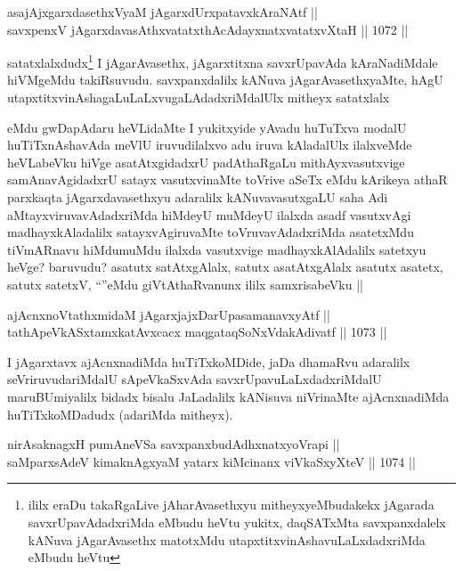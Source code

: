 \begin{shl}
asajAjxgarxdasethxVyaM jAgarxdUrxpatavxkAraNAtf || \\
savxpenxV jAgarxdavasAthxvatatxthAcA\s \s dayxnatxvatatxvXtaH ||  1072 ||  
\end{shl}

\begin{artha}
satatxlalxdudx\footnote{ililx eraDu takaRgaLive jAharAvasethxyu mitheyxyeMbudakekx jAgarada savxrUpavAdadxriMda eMbudu heVtu yukitx, daqSATxMta savxpanxdalelx kANuva jAgarAvasethx matotxMdu utapxtitxvinAshavuLaLxdadxriMda eMbudu heVtu} I jAgarAvasethx, jAgarxtitxna savxrUpavAda kAraNadiMdale hiVMgeMdu takiRsuvudu. savxpanxdalilx kANuva jAgarAvasethxyaMte, hAgU utapxtitxvinAshagaLuLaLxvugaLAdadxriMdalUlx mitheyx satatxlalx
\end{artha}

\begin{artha}
eMdu gwDapAdaru heVLidaMte I yukitxyide yAvadu huTuTxva modalU huTiTxnAshavAda meVlU iruvudilalxvo adu  iruva kAladalUlx ilalxveMde heVLabeVku hiVge asatAtxgidadxrU padAthaRgaLu mithAyxvasutxvige samAnavAgidadxrU satayx vasutxvinaMte toVrive aSeTx eMdu kArikeya athaR parxkaqta jAgarxdavasethxyu adaralilx kANuvavasutxgaLU saha Adi aMtayxviruvavAdadxriMda hiMdeyU muMdeyU ilalxda asadf vasutxvAgi madhayxkAladalilx satayxvAgiruvaMte toVruvavAdadxriMda asatetxMdu tiVmARnavu hiMdumuMdu ilalxda vasutxvige madhayxkAlAdalilx satetxyu heVge? baruvudu? asatutx satAtxgAlalx, satutx asatAtxgAlalx asatutx asatetx, satutx satetxV, ``\stext''eMdu giVtAthaRvanunx ililx samxrisabeVku ||
\end{artha}


\begin{shl}
ajAcnxnoVtathxmidaM jAgarxjajxDarUpasamanavxyAtf || \\
tathA\s peVkASxtamxkatAvxcacx maqgataqSoNxVdakAdivatf ||  1073 ||  
\end{shl}

\begin{artha}
I jAgarxtavx ajAcnxnadiMda huTiTxkoMDide, jaDa dhamaRvu adaralilx seVriruvudariMdalU sApeVkaSxvAda savxrUpavuLaLxdadxriMdalU maruBUmiyalilx bidadx bisalu JaLadalilx kANisuva niVrinaMte ajAcnxnadiMda huTiTxkoMDadudx (adariMda mitheyx).
\end{artha}

\begin{shl}
nirAsaknagxH pumAneVSa savxpanxbudAdhxnatxyoVrapi || \\
saMparxsAdeV kimaknAgxyaM yatarx kiMcinanx viVkaSxyXteV ||  1074 ||  
\end{shl}

